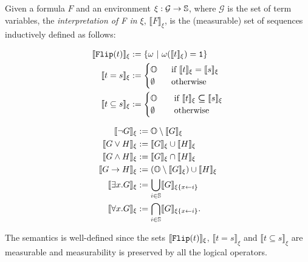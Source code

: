 \begin{defn}\label{def:quantsem}
Given a formula
$F$ and an environment $\xi:\mathcal{G}\rightarrow
\mathbb{S}$, where $\mathcal{G}$
is the set of term variables,
the \emph{interpretation of F in $\xi$},
$\llbracket F\rrbracket_\xi$,
is the (measurable) set of sequences
inductively defined as follows:

\begin{minipage}{\linewidth}
\begin{minipage}[t]{0.4\linewidth}
\begin{align*}
\llbracket \mathtt{Flip}(t)\rrbracket_{\xi} &:= \{\omega \ | \
\omega(\llbracket t\rrbracket_{\xi}) = \mathtt{1}\} \\
\llbracket t=s\rrbracket_\xi &:= \begin{cases}
\mathbb{O} \ \ &\text{if } \llbracket t\rrbracket_\xi = \llbracket s\rrbracket_\xi \\
\emptyset \ \ &\text{otherwise}
\end{cases} \\
\llbracket t\subseteq s\rrbracket_{\xi} &:=
\begin{cases}
\mathbb{O} \ \ \ &\text{if } \llbracket t\rrbracket_\xi
\bm{\subseteq} \llbracket s\rrbracket_\xi \\
\emptyset \ \ \ &\text{otherwise}
\end{cases}
\end{align*}
\end{minipage}
\hfill
\begin{minipage}[t]{0.5\linewidth}
\begin{align*}
\llbracket \neg G\rrbracket_\xi &:=
\Os\setminus\llbracket G\rrbracket_\xi \\
\llbracket G\vee H\rrbracket_\xi &:= \llbracket G\rrbracket_\xi \cup \llbracket H\rrbracket_\xi \\
%
\llbracket G\wedge H\rrbracket_\xi &:=
\llbracket G\rrbracket_\xi \cap \llbracket H\rrbracket_\xi \\
%
\llbracket G\rightarrow H\rrbracket_\xi &:=
(\Os\setminus\llbracket G\rrbracket_\xi)
\cup \llbracket H\rrbracket_\xi \\
%
\llbracket \exists x.G\rrbracket_\xi &:=
\bigcup_{i\in\Ss} \llbracket G\rrbracket_{\xi\{x\leftarrow i\}} \\
%
\llbracket \forall x.G\rrbracket_\xi &:=
\bigcap_{i\in \Ss}\llbracket G\rrbracket_{\xi\{x\leftarrow i\}}.
\end{align*}
\end{minipage}
\end{minipage}
\end{defn}
\noindent
The semantics is well-defined since
the sets $\llbracket \mathtt{Flip}(t)\rrbracket_\xi$,
$\llbracket t=s\rrbracket_\xi$
and $\llbracket t\subseteq s\rrbracket_\xi$
are measurable
and measurability is preserved by all
the logical operators.










